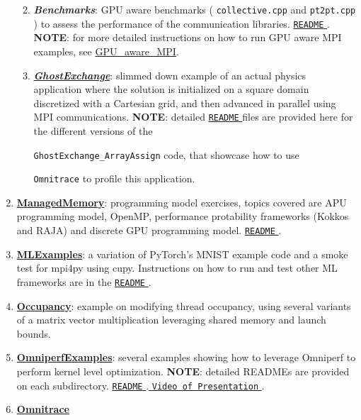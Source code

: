 \documentclass[
]{article}
\providecommand{\tightlist}{%
  \setlength{\itemsep}{0pt}\setlength{\parskip}{0pt}}
\let\oldtexttt\texttt
\renewcommand{\texttt}[1]{
  \colorbox{Light}{\oldtexttt{#1}}
}
\providecommand{\tightlist}{%
  \setlength{\itemsep}{0pt}\setlength{\parskip}{0pt}}
\begin{document}
\begin{enumerate}
  \begin{enumerate}
  \def\labelenumii{\arabic{enumii}.}
  \tightlist
  \item
    \textbf{\emph{Benchmarks}}: GPU aware benchmarks
    (\texttt{collective.cpp} and \texttt{pt2pt.cpp}) to assess the
    performance of the communication libraries.
    \href{https://github.com/amd/HPCTrainingExamples/blob/main/MPI-examples/README.md}{\texttt{README}}.
    \textbf{NOTE}: for more detailed instructions on how to run GPU
    aware MPI examples, see
    \href{https://github.com/amd/HPCTrainingExamples/tree/main/GPU_aware_MPI/README.md}{GPU\_aware\_MPI}.
  \item
    \href{https://github.com/amd/HPCTrainingExamples/tree/main/MPI-examples/GhostExchange}{\textbf{\emph{GhostExchange}}}:
    slimmed down example of an actual physics application where the
    solution is initialized on a square domain discretized with a
    Cartesian grid, and then advanced in parallel using MPI
    communications. \textbf{NOTE}: detailed
    \href{https://github.com/amd/HPCTrainingExamples/blob/main/MPI-examples/GhostExchange/GhostExchange_ArrayAssign/README.md}{\texttt{README}}
    files are provided here for the different versions of the
    \texttt{GhostExchange\_ArrayAssign} code, that showcase how to use
    \texttt{Omnitrace} to profile this application.
  \end{enumerate}
\item
  \href{https://github.com/amd/HPCTrainingExamples/tree/main/ManagedMemory}{\textbf{ManagedMemory}}:
  programming model exercises, topics covered are APU programming model,
  OpenMP, performance protability frameworks (Kokkos and RAJA) and
  discrete GPU programming model.
  \href{https://github.com/amd/HPCTrainingExamples/blob/main/ManagedMemory/README.md}{\texttt{README}}.
\item
  \href{https://github.com/amd/HPCTrainingExamples/tree/main/MLExamples}{\textbf{MLExamples}}:
  a variation of PyTorch's MNIST example code and a smoke test for
  mpi4py using cupy. Instructions on how to run and test other ML
  frameworks are in the
  \href{https://github.com/amd/HPCTrainingExamples/tree/main/MLExamples/README.md}{\texttt{README}}.
\item
  \href{https://github.com/amd/HPCTrainingExamples/tree/main/Occupancy}{\textbf{Occupancy}}:
  example on modifying thread occupancy, using several variants of a
  matrix vector multiplication leveraging shared memory and launch
  bounds.
\item
  \href{https://github.com/amd/HPCTrainingExamples/tree/main/OmniperfExamples}{\textbf{OmniperfExamples}}:
  several examples showing how to leverage Omniperf to perform kernel
  level optimization. \textbf{NOTE}: detailed READMEs are provided on
  each subdirectory.
  \href{https://github.com/amd/HPCTrainingExamples/blob/main/OmniperfExamples/README.md}{\texttt{README}}.\href{https://fs.hlrs.de/projects/par/events/2024/GPU-AMD/day4/Introdution\%20to\%20omniperf.mp4}{\texttt{Video\ of\ Presentation}}.
\item
  \href{https://github.com/amd/HPCTrainingExamples/tree/main/Omnitrace}{\textbf{Omnitrace}}


\end{enumerate}
\end{document}
